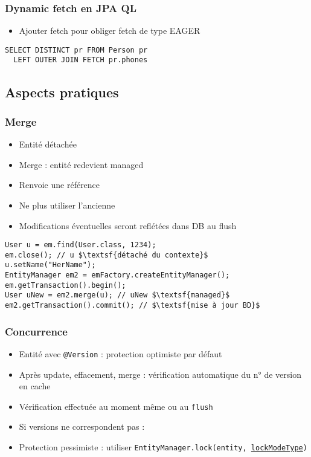 \documentclass[english, french]{beamer}
\begin{document}
\begin{frame}[fragile]
	\frametitle{Dynamic fetch en JPA QL}
	\begin{itemize}
		\item Ajouter fetch pour obliger fetch de type EAGER
	\end{itemize}
	\begin{lstlisting}
SELECT DISTINCT pr FROM Person pr 
  LEFT OUTER JOIN FETCH pr.phones
	\end{lstlisting}
\end{frame}

\subsection{Aspects pratiques}
\begin{frame}[fragile]
	\frametitle{Merge}
	\begin{itemize}
		\item Entité détachée
		\item Merge : entité redevient managed
		\item Renvoie une référence
		\item Ne plus utiliser l’ancienne
		\item Modifications éventuelles seront reflétées dans DB au flush
	\end{itemize}
	\begin{lstlisting}[escapechar=$]
User u = em.find(User.class, 1234);
em.close(); // u $\textsf{détaché du contexte}$
u.setName("HerName");
EntityManager em2 = emFactory.createEntityManager();
em.getTransaction().begin();
User uNew = em2.merge(u); // uNew $\textsf{managed}$
em2.getTransaction().commit(); // $\textsf{mise à jour BD}$
	\end{lstlisting}
\end{frame}

\begin{frame}
	\frametitle{Concurrence}
	\begin{itemize}
		\item Entité avec \texttt{@Version} : protection optimiste par défaut
		\item Après update, effacement, merge : vérification automatique du n° de version en cache%
		\item Vérification effectuée au moment même ou au \texttt{flush}
		\item Si versions ne correspondent pas : 
		\item Protection pessimiste : utiliser \texttt{EntityManager.lock(entity, \href{https://docs.oracle.com/javaee/7/api/javax/persistence/LockModeType.html}{lockModeType})}
	\end{itemize}
\end{frame}
\end{document}
